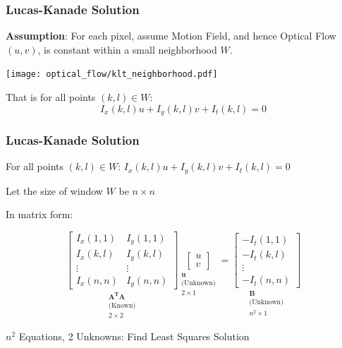 \begin{frame}
  \frametitle{Lucas-Kanade Solution}

  \textbf{Assumption}: For each pixel, assume Motion Field, and hence Optical Flow $(u,v)$, is constant within a small neighborhood $W$.

  \begin{center}
    \texttt{[image: optical\_flow/klt\_neighborhood.pdf]}
  \end{center}

  That is for all points $(k,l) \in W$:
  \[
  I_x(k,l)u + I_y(k,l)v + I_t(k,l) = 0
  \]

\end{frame}

\begin{frame}
  \frametitle{Lucas-Kanade Solution}

  For all points $(k,l) \in W$: \quad 
  $I_x(k,l)u + I_y(k,l)v + I_t(k,l) = 0$

  Let the size of window $W$ be $n \times n$

  In matrix form:

  \begin{equation*}
    \underset{\substack{\mathbf{A^T A} \\ \text{(Known)} \\2\times2}}{
    \boxed{
    \begin{bmatrix}
      I_x(1,1) & I_y(1,1) \\
      I_x(k,l) & I_y(k,l) \\
      \vdots & \vdots \\
      I_x(n,n) & I_y(n,n)
    \end{bmatrix}
    }}
    \underset{\substack{\mathbf{u} \\ \text{(Unknown)}\\ 2\times1}}{
    \boxed{
    \begin{bmatrix}
      u \\
      v
    \end{bmatrix}
    }}
    =
    \underset{\substack{\mathbf{B} \\ \text{(Unknown)}\\ n^{2}\times1}}{
    \boxed{
      \begin{bmatrix}
      -I_t(1,1) \\
      -I_t(k,l) \\
      \vdots \\
      -I_t(n,n)
      \end{bmatrix}
    }}
  \end{equation*}


  $n^2$ Equations, 2 Unknowns: Find Least Squares Solution

\end{frame}

